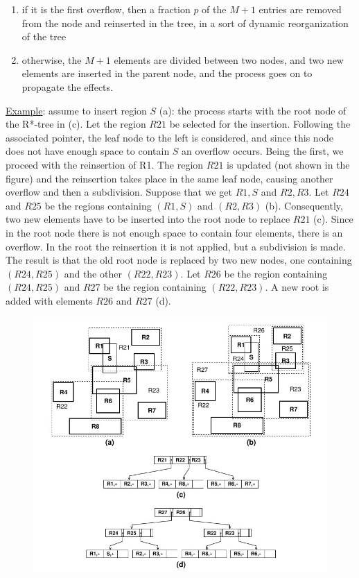 \begin{itemize}
    \begin{enumerate}
        \item if it is the first overflow, then a fraction $p$ of the $M+1$ entries are removed from the node and reinserted in the tree, in a sort of dynamic reorganization of the tree
        \item otherwise, the $M+1$ elements are divided between two nodes, and two new elements are inserted in the parent node, and the process goes on to propagate the effects.
    \end{enumerate}

    \underline{Example}: assume to insert region $S$ (a): the process starts with the root node of the R*-tree in (c). Let the region $R21$ be selected for the insertion. Following the associated pointer, the leaf node to the left is considered, and since this node does not have enough space to contain $S$ an overflow occurs. Being the first, we proceed with the reinsertion of R1. The region $R21$ is updated (not shown in the figure) and the reinsertion takes place in the same leaf node, causing another overflow and then a subdivision. Suppose that we get ${R1, S}$ and ${R2, R3}$. Let $R24$ and $R25$ be the regions containing $(R1, S)$ and $(R2, R3)$ (b). Consequently, two new elements have to be inserted into the root node to replace $R21$ (c). Since in the root node there is not enough space to contain four elements, there is an overflow. In the root the reinsertion it is not applied, but a subdivision is made. The result is that the old root node is replaced by two new nodes, one containing $(R24, R25)$ and the other $(R22, R23)$. Let $R26$ be the region containing $(R24, R25)$ and $R27$ be the region containing $(R22, R23)$. A new root is added with elements $R26$ and $R27$ (d).

    \begin{figure}[h!]
		\centering
		\includegraphics[scale = 1.6]{img/part10.jpg}
		\label{part6}
    \end{figure}
\end{itemize}